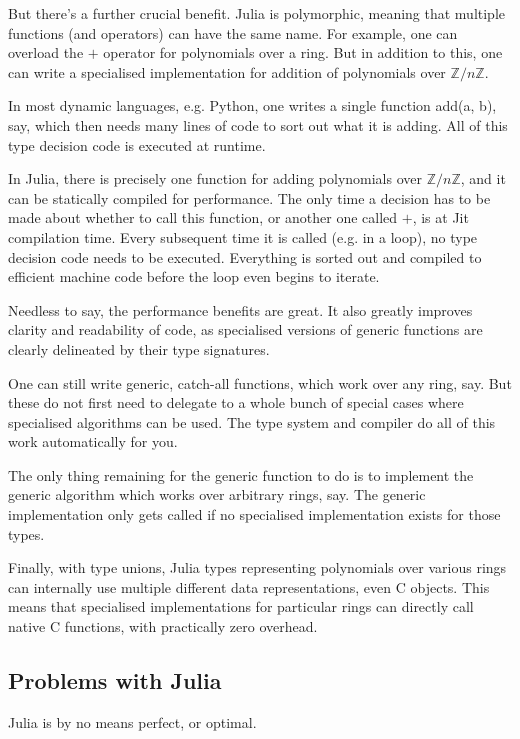 \documentclass[a4paper,10pt]{article}
\newcommand{\Z}{\mathbb{Z}}
\begin{document}
But there's a further crucial benefit. Julia is polymorphic, meaning that multiple functions
(and operators) can have the same name. For example, one can overload the $+$ operator
for polynomials over a ring. But in addition to this, one can write a specialised 
implementation for addition of polynomials over $\Z/n\Z$.

In most dynamic languages, e.g. Python, one writes a single function add(a, b), say, which
then needs many lines of code to sort out what it is adding. All of this type decision code
is executed at runtime. 

In Julia, there is precisely one function for adding polynomials over $\Z/n\Z$, and it can
be statically compiled for performance. The only time a decision has to be made about whether
to call this function, or another one called $+$, is at Jit compilation time. Every subsequent
time it is called (e.g. in a loop), no type decision code needs to be executed. Everything
is sorted out and compiled to efficient machine code before the loop even begins to iterate.

Needless to say, the performance benefits are great. It also greatly improves clarity
and readability of code, as specialised versions of generic functions are clearly
delineated by their type signatures.

One can still write generic, catch-all functions, which work over any ring, say. But
these do not first need to delegate to a whole bunch of special cases where specialised
algorithms can be used. The type system and compiler do all of this work automatically 
for you.

The only thing remaining for the generic function to do is to implement the generic
algorithm which works over arbitrary rings, say. The generic implementation only gets
called if no specialised implementation exists for those types.

Finally, with type unions, Julia types representing polynomials over various rings can
internally use multiple different data representations, even C objects. This means that
specialised implementations for particular rings can directly call native C functions,
with practically zero overhead.

\subsection{Problems with Julia}

Julia is by no means perfect, or optimal.
\end{document}
